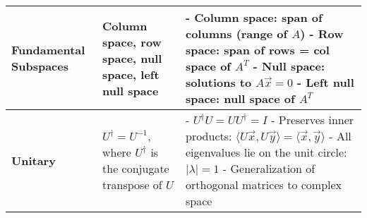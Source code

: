 \documentclass[12pt]{article}
\begin{document}
\begin{adjustwidth}{-1cm}{-2cm}
\begin{longtable}{|>{\bfseries}m{3.5cm}|m{5cm}|m{10.5cm}|}
				\hline
				Fundamental Subspaces & Column space, row space, null space, left null space &
				- Column space: span of columns (range of $A$) \newline
				- Row space: span of rows = col space of $A^T$ \newline
				- Null space: solutions to $A\vec{x} = 0$ \newline
				- Left null space: null space of $A^T$ \\
				\hline
				Unitary & $U^\dagger = U^{-1}$, where $U^\dagger$ is the conjugate
				transpose of $U$ &
				- $U^\dagger U = U U^\dagger = I$ \newline
				- Preserves inner products: $\langle U\vec{x}, U\vec{y} \rangle =
				\langle \vec{x}, \vec{y} \rangle$ \newline
				- All eigenvalues lie on the unit circle: $|\lambda| = 1$ \newline
				- Generalization of orthogonal matrices to complex space \\
				\hline

		\end{longtable}
\end{adjustwidth}
\end{document}
